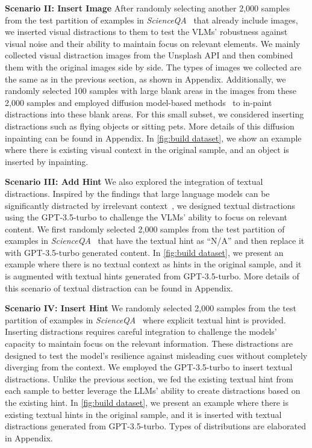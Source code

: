 \textbf{Scenario II: Insert Image}
After randomly selecting another 2,000 samples from the test partition of examples in \emph{ScienceQA}~\citep{lu2022scienceqa} that already include images, we inserted visual distractions to them to test the VLMs' robustness against visual noise and their ability to maintain focus on relevant elements. We mainly collected visual distraction images from the Unsplash API \citep{unsplashapi} and then combined them with the original images side by side. The types of images we collected are the same as in the previous section, as shown in Appendix. Additionally, we randomly selected 100 samples with large blank areas in the images from these 2,000 samples and employed diffusion model-based methods~\citep{promeai2024} to in-paint distractions into these blank areas. For this small subset, we considered inserting distractions such as flying objects or sitting pets. More details of this diffusion inpainting can be found in Appendix. In \autoref{fig:build dataset}, we show an example where there is existing visual context in the original sample, and an object is inserted by inpainting.

\textbf{Scenario III: Add Hint}
We also explored the integration of textual distractions. Inspired by the findings that large language models can be significantly distracted by irrelevant context~\citep{shi2023large}, we designed textual distractions using the GPT-3.5-turbo  to challenge the VLMs' ability to focus on relevant content. We first randomly selected 2,000 samples from the test partition of examples in \emph{ScienceQA}~\citep{lu2022scienceqa} that have the textual hint as ``N/A'' and then replace it with GPT-3.5-turbo generated content. In \autoref{fig:build dataset}, we present an example where there is no textual context as hints in the original sample, and it is augmented with textual hints generated from GPT-3.5-turbo. More details of this scenario of textual distraction can be found in Appendix.

\textbf{Scenario IV: Insert Hint}
We randomly selected 2,000 samples from the test partition of examples in \emph{ScienceQA}~\citep{lu2022scienceqa} where explicit textual hint is provided. Inserting distractions requires careful integration to challenge the models' capacity to maintain focus on the relevant information. These distractions are designed to test the model's resilience against misleading cues without completely diverging from the context. We employed the GPT-3.5-turbo to insert textual distractions. Unlike the previous section, we fed the existing textual hint from each sample to better leverage the LLMs' ability to create distractions based on the existing hint. In \autoref{fig:build dataset}, we present an example where there is existing textual hints in the original sample, and it is inserted with textual distractions generated from GPT-3.5-turbo. Types of distributions are elaborated in Appendix.

